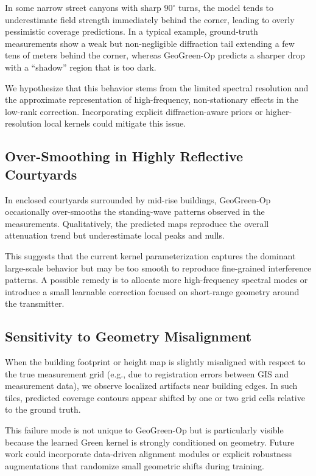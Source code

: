 \documentclass{article}
\begin{document}
In some narrow street canyons with sharp $90^\circ$ turns, the model
tends to underestimate field strength immediately behind the corner,
leading to overly pessimistic coverage predictions.
In a typical example, ground-truth measurements show a weak but
non-negligible diffraction tail extending a few tens of meters
behind the corner, whereas GeoGreen-Op predicts a sharper drop with
a “shadow” region that is too dark.

We hypothesize that this behavior stems from the limited spectral
resolution and the approximate representation of high-frequency,
non-stationary effects in the low-rank correction.
Incorporating explicit diffraction-aware priors or higher-resolution
local kernels could mitigate this issue.

\subsection{Over-Smoothing in Highly Reflective Courtyards}

In enclosed courtyards surrounded by mid-rise buildings,
GeoGreen-Op occasionally over-smooths the standing-wave patterns
observed in the measurements.
Qualitatively, the predicted maps reproduce the overall attenuation
trend but underestimate local peaks and nulls.

This suggests that the current kernel parameterization captures the
dominant large-scale behavior but may be too smooth to reproduce
fine-grained interference patterns.
A possible remedy is to allocate more high-frequency spectral modes
or introduce a small learnable correction focused on short-range
geometry around the transmitter.

\subsection{Sensitivity to Geometry Misalignment}

When the building footprint or height map is slightly misaligned
with respect to the true measurement grid (e.g., due to registration
errors between GIS and measurement data), we observe localized
artifacts near building edges.
In such tiles, predicted coverage contours appear shifted by one
or two grid cells relative to the ground truth.

This failure mode is not unique to GeoGreen-Op but is particularly
visible because the learned Green kernel is strongly conditioned on
geometry.
Future work could incorporate data-driven alignment modules or
explicit robustness augmentations that randomize small geometric
shifts during training.
\end{document}
